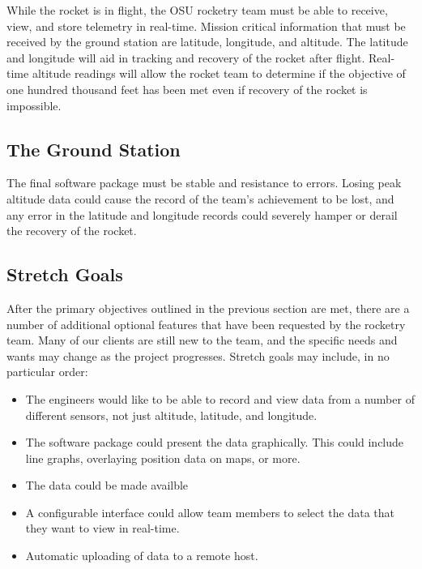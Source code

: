 \documentclass[10pt,journal,draftclsnofoot,onecolumn]{IEEEtran}
\begin{document}
While the rocket is in flight, the \ac{OSU} rocketry team
must be able to receive, view, and store telemetry in real-time.
Mission critical information that must be received by the ground
station are latitude, longitude, and altitude. The latitude
and longitude will aid in tracking and recovery of the rocket
after flight. Real-time altitude readings will allow the rocket
team to determine if the objective of one hundred thousand feet
has been met even if recovery of the rocket is impossible.

\subsection{The Ground Station}

The final software package must be stable and resistance to errors.
Losing peak altitude data could cause the record of the team's
achievement to be lost, and any error in the latitude
and longitude records could severely hamper or derail
the recovery of the rocket.

\subsection{Stretch Goals}
After the primary objectives outlined in the previous section
are met, there are a number of additional optional features
that have been requested by the rocketry team.
Many of our clients are still new to the team, and the specific
needs and wants may change as the project progresses.
Stretch goals may include, in no particular order:

\begin{itemize}
\item The engineers would like to be able to record and view data
from a number of different sensors, not just altitude,
latitude, and longitude.

\item The software package could present the data graphically.
This could include line graphs, overlaying position data
on maps, or more.

\item The data could be made availble 

\item A configurable interface could allow team members
to select the data that they want to view in real-time.

\item Automatic uploading of data to a remote host.

\end{itemize}
\end{document}
